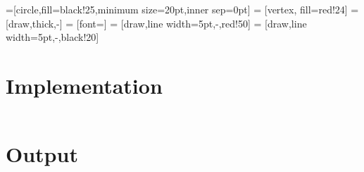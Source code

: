 \documentclass[paper=letter, fontsize=12pt]{article}
\begin{document}
=[circle,fill=black!25,minimum size=20pt,inner sep=0pt]
 = [vertex, fill=red!24]
 = [draw,thick,-]
 = [font=\small]
 = [draw,line width=5pt,-,red!50]
 = [draw,line width=5pt,-,black!20]


\section{Implementation}

\inputminted[frame=lines, breaklines, linenos]{c}{../krushkal_disjoint_ds.c}

\section*{Output}
\inputminted[frame=lines, breaklines]{text}{../krushkal_output.txt}
\end{document}
